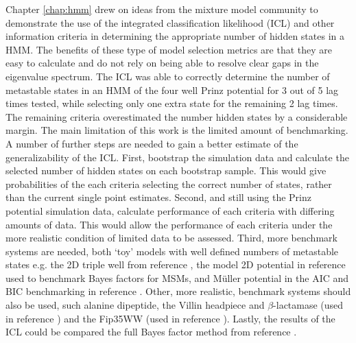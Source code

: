 Chapter \ref{chap:hmm} drew on ideas from the mixture model community to demonstrate the use of the integrated classification likelihood (ICL) and other information criteria in determining  the appropriate number of hidden states in a HMM.  The benefits of these type of model selection metrics are that they are easy to calculate and do not rely on being able to resolve clear gaps in the eigenvalue spectrum. The ICL was able to correctly determine the number of metastable states in an HMM of the four well Prinz potential for \num{3} out of \num{5} lag times tested, while selecting only one extra state for the remaining \num{2} lag times. The remaining criteria overestimated the number  hidden states by a considerable margin. The main limitation of this work is the limited amount of  benchmarking. A number of further steps are needed to gain a better estimate of the generalizability of the ICL. First, bootstrap the simulation data and calculate the selected number of hidden states on each bootstrap sample. This would give probabilities of the each criteria selecting the correct number of states, rather than the current single point estimates. Second, and still using the Prinz potential simulation data, calculate performance of each criteria with differing amounts of data. This would allow the performance of each criteria under the more realistic condition of limited data to be assessed. Third, more benchmark systems are needed, both `toy' models with well defined numbers of metastable states e.g. the 2D triple well from reference \cite{noeProjectedHiddenMarkov2013a}, the model 2D potential in reference \cite{bacalladoBayesianComparisonMarkov2009a} used to benchmark Bayes factors for MSMs, and M{\"u}ller potential in the AIC and BIC benchmarking in reference \cite{mcgibbonStatisticalModelSelection2014a}. Other, more realistic,  benchmark systems should also be used, such alanine dipeptide, the Villin headpiece and $\beta$-lactamase (used in reference \cite{bowmanQuantitativeComparisonAlternative2013}) and the Fip35WW (used in reference \cite{mcgibbonStatisticalModelSelection2014a}). Lastly, the results of the ICL could be compared the full Bayes factor method from  reference \cite{bacalladoBayesianComparisonMarkov2009a}. 

